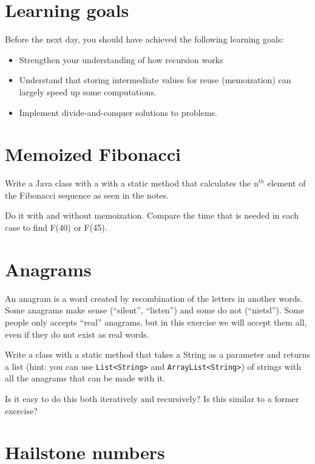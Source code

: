 \documentclass{article}
\begin{document}
\section*{Learning goals}
\label{sec:learning-goals}

Before the next day, you should have achieved the following learning
goals: 

\begin{itemize}
\item Strengthen your understanding of how recursion works
\item Understand that storing intermediate values for reuse
  (memoization) can largely speed up some computations. 
\item Implement divide-and-conquer solutions to problems. 
\end{itemize}

\section{Memoized Fibonacci}

Write a Java class with a with a static method that calculates 
the n$^{th}$ element of the Fibonacci sequence as seen in the notes.

Do it with and without memoization. Compare
the time that is needed in each case to find F(40) or F(45). 

\section{Anagrams}
\label{sec:anagrams}

An anagram is a word created by recombination of the letters in
another words. Some anagrams make sense (``silent'', ``listen'') and
some do not (``nietsl''). Some people only accepts ``real'' anagrams,
but in this exercise we will accept them all, even if they do not
exist as real words. 

Write a class with a static method that takes a String as a parameter
and returns a list (hint: you can use \verb+List<String>+ and
\verb+ArrayList<String>+) of strings with all the anagrams that can be
made with it. 

Is it easy to do this both iteratively and recursively? Is this
similar to a former exercise?

\section{Hailstone numbers}
\label{sec:hailstone-numbers}
\end{document}
